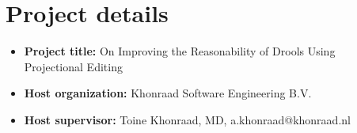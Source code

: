 \section*{Project details}

\begin{itemize}
    \item \textbf{Project title:} On Improving the Reasonability of Drools Using\\Projectional Editing
    \item \textbf{Host organization:} Khonraad Software Engineering B.V. 
    \item \textbf{Host supervisor:} Toine Khonraad, MD, a.khonraad@khonraad.nl
\end{itemize}